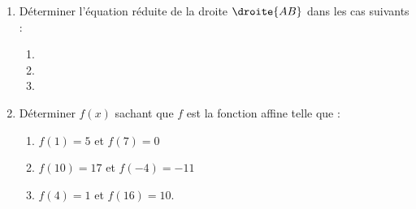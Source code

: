 %
%
%
\begin{exr}
  \begin{enumerate}
  \item  Déterminer l'équation réduite de la droite $\droite{AB}$ dans les cas suivants :
    \begin{multicols}{3}
      \begin{enumerate}
      \item {}\typepoints\mypoints
      \item {}\typepoints\mypoints
      \item {}\typepoints\mypoints
      \end{enumerate}
    \end{multicols}
  \item Déterminer $f(x)$ sachant que $f$ est la fonction affine telle que :
    \begin{multicols}{3}
      \begin{enumerate}
      \item $f(1)=5$ et $f(7)=0$
      \item $f(10)=17$ et $f(-4)=-11$
      \item $f(4)=1$ et $f(16)=10$.
      \end{enumerate}
    \end{multicols}
 \end{enumerate}
\end{exr}
